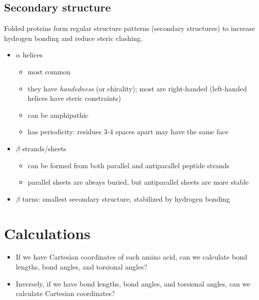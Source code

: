 \documentclass[10pt]{article}
\newenvironment{mitemize}
{
  \begin{itemize}
  \setlength{\itemsep}{1pt}
  \setlength{\parskip}{0pt}
  \setlength{\parsep}{0pt}}{\end{itemize}
}
\begin{document}
\subsection*{Secondary structure}
Folded proteins form regular structure patterns (secondary structures) to increase hydrogen bonding and reduce steric clashing.
\begin{mitemize}
  \item $\alpha$ helices
  \begin{mitemize}
    \item most common
    \item they have \textit{handedness} (or chirality); most are right-handed (left-handed helices have steric constraints)
    \item can be amphipathic
    \item has periodicity: residues 3-4 spaces apart may have the same face
  \end{mitemize}
  \item $\beta$ strands/sheets
  \begin{mitemize}
    \item can be formed from both parallel and antiparallel peptide strands
    \item parallel sheets are always buried, but antiparallel sheets are more stable
  \end{mitemize}
  \item $\beta$ turns: smallest secondary structure, stabilized by hydrogen bonding
\end{mitemize}

\section*{Calculations}
\begin{mitemize}
  \item If we have Cartesian coordinates of each amino acid, can we calculate bond lengths, bond angles, and torsional angles?
  \item Inversely, if we have bond lengths, bond angles, and torsional angles, can we calculate Cartesian coordinates?
\end{mitemize}
\end{document}
